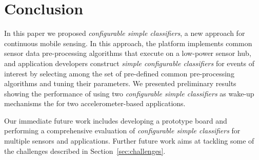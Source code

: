 \section{Conclusion}
\label{sec:conclusion}

In this paper we proposed {\em configurable simple classifiers}, a new
approach for continuous mobile sensing.  In this approach, the platform implements
common sensor data pre-processing algorithms that execute on a low-power sensor hub, and
application developers construct {\em simple configurable classifiers}
for events of interest by selecting among the set of pre-defined
common pre-processing algorithms and tuning their parameters.  We presented
preliminary results showing the performance of using two {\em configurable 
simple classifiers} as wake-up mechanisms the for two accelerometer-based applications.

Our immediate future work includes developing a prototype board and 
performing a comprehensive evaluation of {\em configurable simple 
classifiers} for multiple sensors and applications. Further future work 
aims at tackling some of the challenges described in Section~\ref{sec:challenges}.  
